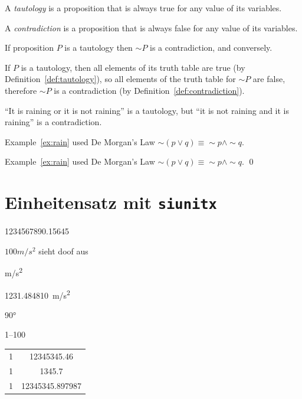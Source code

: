 \documentclass[12pt,parskip=half]{scrartcl}
\begin{document}


\begin{Definition}[Tautology]\label{def:tautology}
A \emph{tautology} is a proposition that is always true for any value of its variables.
\end{Definition}

\begin{Definition}[Contradiction]\label{def:contradiction}
A \emph{contradiction} is a proposition that is always false for any value of its variables.
\end{Definition}

\begin{Theorem}
If proposition $P$ is a tautology then $\sim P$ is a contradiction, and conversely.
\begin{Proof}
If $P$ is a tautology, then all elements of its truth table are true (by Definition~\ref{def:tautology}), so all elements of the truth table for $\sim P$ are false, therefore $\sim P$ is a contradiction (by Definition~\ref{def:contradiction}).
\end{Proof}
\end{Theorem}

\begin{Example}\label{ex:rain}
``It is raining or it is not raining'' is a tautology, but ``it is not raining and it is raining'' is a contradiction.
\end{Example}

\begin{Remark}
Example~\ref{ex:rain} used De Morgan's Law $\sim (p \vee q) \equiv \sim p \wedge \sim q$.
\end{Remark}

\begin{Proof}
Example~\ref{ex:rain} used De Morgan's Law $\sim (p \vee q) \equiv \sim p \wedge \sim q$. \qed
\end{Proof}

\section{Einheitensatz mit \texttt{siunitx}}

\num{1234567890,15645}

$100 m/s^2$ sieht doof aus

\si{\m/\second^2}

\SI{1231,484810}{\m/\second^2}

\ang{90}

\numrange{1}{100}

\begin{tabular}{lS}
1 & 12345345.46 \\
1 & 1345.7 \\
1 & 12345345.897987 \\
\end{tabular}
\end{document}
